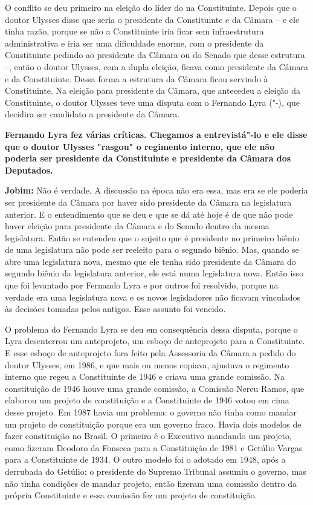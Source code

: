 O conflito se deu primeiro na eleição do líder do  na Constituinte.
Depois que o doutor Ulysses disse que seria o presidente da Constituinte
e da Câmara -- e ele tinha razão, porque se não a Constituinte iria
ficar sem infraestrutura administrativa e iria ser uma dificuldade
enorme, com o presidente da Constituinte pedindo ao presidente da Câmara
ou do Senado que desse estrutura --, então o doutor Ulysses, com a dupla
eleição, ficava como presidente da Câmara e da Constituinte. Dessa forma
a estrutura da Câmara ficou servindo à Constituinte. Na eleição para
presidente da Câmara, que antecedeu a eleição da Constituinte, o doutor
Ulysses teve uma disputa com o Fernando Lyra ("-), que decidira ser
candidato a presidente da Câmara.

\textbf{Fernando Lyra fez várias críticas. Chegamos a entrevistá"-lo e
ele disse que o doutor Ulysses "rasgou" o regimento interno, que ele não
poderia ser presidente da Constituinte e presidente da Câmara dos
Deputados.}

\textbf{Jobim:} Não é verdade. A discussão na época não era essa, mas
era se ele poderia ser presidente da Câmara por haver sido presidente da
Câmara na legislatura anterior. E o entendimento que se deu e que se dá
até hoje é de que não pode haver eleição para presidente da Câmara e do
Senado dentro da mesma legislatura. Então se entendeu que o sujeito que
é presidente no primeiro biênio de uma legislatura não pode ser reeleito
para o segundo biênio. Mas, quando se abre uma legislatura nova, mesmo
que ele tenha sido presidente da Câmara do segundo biênio da legislatura
anterior, ele está numa legislatura nova. Então isso que foi levantado
por Fernando Lyra e por outros foi resolvido, porque na verdade era uma
legislatura nova e os novos legisladores não ficavam vinculados às
decisões tomadas pelos antigos. Esse assunto foi vencido.

O problema do Fernando Lyra se deu em consequência dessa disputa, porque
o Lyra desenterrou um anteprojeto, um esboço de anteprojeto para a
Constituinte. E esse esboço de anteprojeto fora feito pela Assessoria da
Câmara a pedido do doutor Ulysses, em 1986, e que mais ou menos copiava,
ajustava o regimento interno que regeu a Constituinte de 1946 e criava
uma grande comissão. Na constituição de 1946 houve uma grande comissão,
a Comissão Nereu Ramos, que elaborou um projeto de constituição e a
Constituinte de 1946 votou em cima desse projeto. Em 1987 havia um
problema: o governo não tinha como mandar um projeto de constituição
porque era um governo fraco. Havia dois modelos de fazer constituição no
Brasil. O primeiro é o Executivo mandando um projeto, como fizeram
Deodoro da Fonseca para a Constituição de 1981 e Getúlio Vargas para a
Constituinte de 1934. O outro modelo foi o adotado em 1948, após a
derrubada do Getúlio: o presidente do Supremo Tribunal assumiu o
governo, mas não tinha condições de mandar projeto, então fizeram uma
comissão dentro da própria Constituinte e essa comissão fez um projeto
de constituição.

